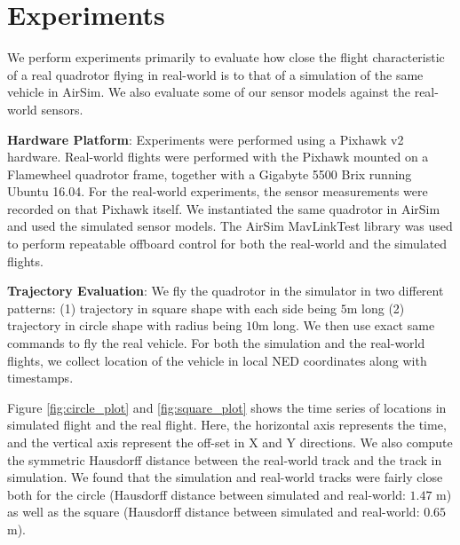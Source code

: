 \documentclass[graybox]{svmult}
\begin{document}


\section{Experiments}
We perform experiments primarily to evaluate how close the flight characteristic of a real quadrotor flying in real-world is to that of a simulation of the same vehicle in AirSim. We also evaluate some of our sensor models against the real-world sensors.

\vspace{0.075in}
\noindent \textbf{Hardware Platform}: Experiments were performed
using a Pixhawk v2 hardware. Real-world flights were performed with the Pixhawk mounted on a Flamewheel quadrotor frame, together with a Gigabyte 5500 Brix running Ubuntu 16.04. For the real-world experiments, the sensor measurements were recorded on that Pixhawk itself. We instantiated the same quadrotor in AirSim and used the simulated sensor models. The AirSim MavLinkTest library was used to perform repeatable offboard control for both the real-world and the simulated flights.

\vspace{0.075in}
\noindent \textbf{Trajectory Evaluation}: We fly the quadrotor in the simulator in two different patterns: (1) trajectory in square shape with each side being $5$m long (2) trajectory in circle shape with radius being $10$m long. We then use exact same commands to fly the real vehicle. For both the simulation and the real-world flights, we collect location of the vehicle in local NED coordinates along with timestamps.

Figure \ref{fig:circle_plot} and \ref{fig:square_plot} shows the time series of locations in simulated flight and the real flight. Here, the horizontal axis represents the time, and the vertical axis represent the off-set in X and Y directions. We also compute the symmetric Hausdorff distance between the real-world track and the track in simulation. We found that the simulation and real-world tracks were fairly close both for the circle (Hausdorff distance between simulated and real-world: $1.47$ m) as well as the square (Hausdorff distance between simulated and real-world: $0.65$ m).
\end{document}
